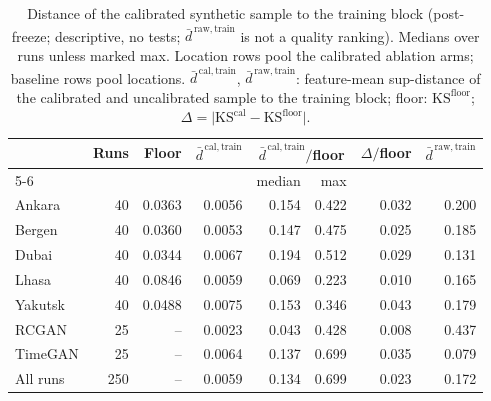 \begin{table}[!htb]
\centering\small
\caption{Distance of the calibrated synthetic sample to the training block (post-freeze; descriptive, no tests; $\bar d^{\,\mathrm{raw,train}}$ is not a quality ranking). Medians over runs unless marked max. Location rows pool the calibrated ablation arms; baseline rows pool locations. $\bar d^{\,\mathrm{cal,train}}$, $\bar d^{\,\mathrm{raw,train}}$: feature-mean sup-distance of the calibrated and uncalibrated sample to the training block; floor: $\mathrm{KS}^{\mathrm{floor}}$; $\Delta=\lvert\mathrm{KS}^{\mathrm{cal}}-\mathrm{KS}^{\mathrm{floor}}\rvert$.}
\label{tab:dist}
\begin{tabular}{lrrrrrrr}
\toprule
 & Runs & Floor & $\bar d^{\,\mathrm{cal,train}}$ & \multicolumn{2}{c}{$\bar d^{\,\mathrm{cal,train}}/$floor} & $\Delta/$floor & $\bar d^{\,\mathrm{raw,train}}$ \\
\cmidrule(lr){5-6}
 & & & & median & max & & \\
\midrule
Ankara & 40 & 0.0363 & 0.0056 & 0.154 & 0.422 & 0.032 & 0.200 \\
Bergen & 40 & 0.0360 & 0.0053 & 0.147 & 0.475 & 0.025 & 0.185 \\
Dubai & 40 & 0.0344 & 0.0067 & 0.194 & 0.512 & 0.029 & 0.131 \\
Lhasa & 40 & 0.0846 & 0.0059 & 0.069 & 0.223 & 0.010 & 0.165 \\
Yakutsk & 40 & 0.0488 & 0.0075 & 0.153 & 0.346 & 0.043 & 0.179 \\
\midrule
RCGAN & 25 & -- & 0.0023 & 0.043 & 0.428 & 0.008 & 0.437 \\
TimeGAN & 25 & -- & 0.0064 & 0.137 & 0.699 & 0.035 & 0.079 \\
\midrule
All runs & 250 & -- & 0.0059 & 0.134 & 0.699 & 0.023 & 0.172 \\
\bottomrule
\end{tabular}
\end{table}
